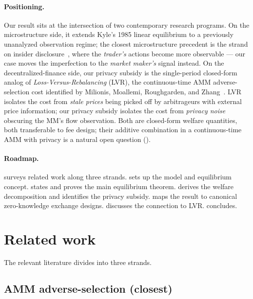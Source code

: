 \documentclass[runningheads]{llncs}
\begin{document}
\paragraph{Positioning.}
Our result sits at the intersection of two contemporary research
programs. On the microstructure side, it extends Kyle's 1985 linear
equilibrium to a previously unanalyzed observation regime; the
closest microstructure precedent is the strand on insider
disclosure~\cite{huddart2001disclosure}, where the
\emph{trader's} actions become more observable --- our case moves
the imperfection to the \emph{market maker's} signal instead. On
the decentralized-finance side, our privacy subsidy is the
single-period closed-form analog of \emph{Loss-Versus-Rebalancing}
(LVR), the continuous-time AMM adverse-selection cost identified by
Milionis, Moallemi, Roughgarden, and Zhang~\cite{milionis2022lvr}.
LVR isolates the cost from \emph{stale prices} being picked off by
arbitrageurs with external price information; our privacy subsidy
isolates the cost from \emph{privacy noise} obscuring the MM's flow
observation. Both are closed-form welfare quantities, both
transferable to fee design; their additive combination in a
continuous-time AMM with privacy is a natural open question
().

\paragraph{Roadmap.}
 surveys related work along three strands.
 sets up the model and equilibrium concept.
 states and proves the main equilibrium
theorem.  derives the welfare decomposition and
identifies the privacy subsidy.  maps the
result to canonical zero-knowledge exchange designs.
 discusses the connection to LVR.
 concludes.

\section{Related work}
\label{sec:related}

The relevant literature divides into three strands.

\subsection{AMM adverse-selection (closest)}
\end{document}

